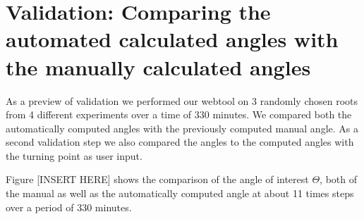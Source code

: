 \section{Validation: Comparing the automated calculated angles with the manually calculated angles}

As a preview of validation we performed our webtool on 3 randomly chosen roots from 4 different experiments over a time of 330 minutes. We compared both the automatically computed angles with the previously computed manual angle. As a second validation step we also compared the angles to the computed angles with the turning point as user input.

Figure [INSERT HERE] shows the comparison of the angle of interest \( \Theta \), both of the manual as well as the automatically computed angle at about 11 times steps over a period of 330 minutes.




